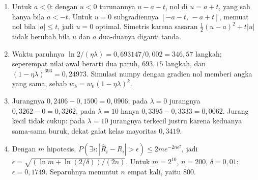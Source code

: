 \begin{enumerate}[label=\textbf{26.\arabic*}]
  \item Untuk $a<0$: dengan $u<0$ turunannya $u-a-t$, nol di $u=a+t$, yang sah
        hanya bila $a<-t$. Untuk $u=0$ subgradiennya $[-a-t,\,-a+t]$, memuat nol
        bila $|a|\le t$, jadi $u=0$ optimal. Simetris karena sasaran
        $\frac12(u-a)^{2}+t|u|$ tidak berubah bila $u$ dan $a$ dua-duanya diganti
        tanda.

  \item Waktu paruhnya $\ln2/(\eta\lambda)=0{,}693147/0{,}002=346{,}57$ langkah;
        seperempat nilai awal berarti dua paruh, $693{,}15$ langkah, dan
        $(1-\eta\lambda)^{693}=0{,}24973$. Simulasi numpy dengan gradien nol
        memberi angka yang sama, sebab $w_{k}=w_{0}(1-\eta\lambda)^{k}$.

  \item Jurangnya $0{,}2406-0{,}1500=0{,}0906$; pada $\lambda=0$ jurangnya
        $0{,}3262-0=0{,}3262$, pada $\lambda=10$ hanya $0{,}3395-0{,}3333=0{,}0062$.
        Jurang kecil tidak cukup: pada $\lambda=10$ jurangnya terkecil justru karena
        keduanya sama-sama buruk, dekat galat kelas mayoritas $0{,}3419$.

  \item Dengan $m$ hipotesis, $P(\exists i:|\hat R_{i}-R_{i}|>\epsilon)\le
        2m e^{-2n\epsilon^{2}}$, jadi $\epsilon=\sqrt{(\ln m+\ln(2/\delta))/(2n)}$.
        Untuk $m=2^{10}$, $n=200$, $\delta=0{,}01$: $\epsilon=0{,}1749$. Separuhnya
        menuntut $n$ empat kali, yaitu $800$.
\end{enumerate}

